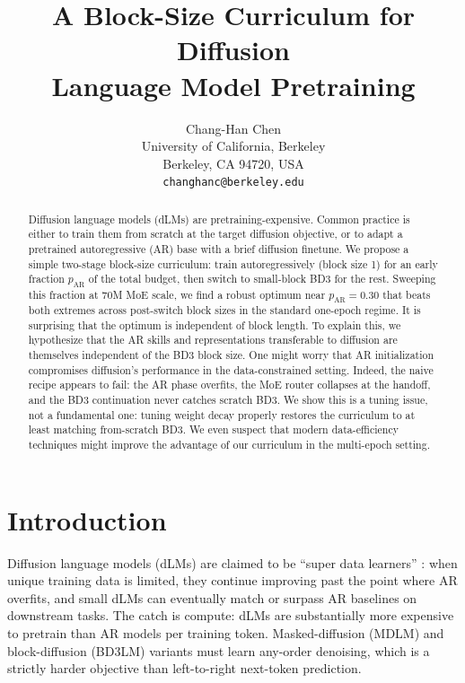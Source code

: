\documentclass{article}
\title{A Block-Size Curriculum for Diffusion\\Language Model Pretraining}
\author{Chang-Han Chen \\
University of California, Berkeley \\
Berkeley, CA 94720, USA \\
\texttt{changhanc@berkeley.edu}
}
\newcommand{\pAR}{p_{\mathrm{AR}}}
\begin{document}
\maketitle

\begin{abstract}
Diffusion language models (dLMs) are pretraining-expensive. Common practice is either to train them from scratch at the target diffusion objective, or to adapt a pretrained autoregressive (AR) base with a brief diffusion finetune. We propose a simple two-stage block-size curriculum: train autoregressively (block size 1) for an early fraction $\pAR$ of the total budget, then switch to small-block BD3 for the rest. Sweeping this fraction at 70M MoE scale, we find a robust optimum near $\pAR{=}0.30$ that beats both extremes across post-switch block sizes in the standard one-epoch regime. It is surprising that the optimum is independent of block length. To explain this, we hypothesize that the AR skills and representations transferable to diffusion are themselves independent of the BD3 block size. One might worry that AR initialization compromises diffusion's performance in the data-constrained setting. Indeed, the naive recipe appears to fail: the AR phase overfits, the MoE router collapses at the handoff, and the BD3 continuation never catches scratch BD3. We show this is a tuning issue, not a fundamental one: tuning weight decay properly restores the curriculum to at least matching from-scratch BD3. We even suspect that modern data-efficiency techniques might improve the advantage of our curriculum in the multi-epoch setting.
\end{abstract}

\section{Introduction}
\label{sec:intro}

Diffusion language models (dLMs) are claimed to be ``super data learners'' \citep{ni2025diffusionlanguagemodelssuper, gao2025whatmakes}: when unique training data is limited, they continue improving past the point where AR overfits, and small dLMs can eventually match or surpass AR baselines on downstream tasks. The catch is compute: dLMs are substantially more expensive to pretrain than AR models per training token. Masked-diffusion (MDLM) and block-diffusion (BD3LM) variants must learn any-order denoising, which is a strictly harder objective than left-to-right next-token prediction.
\end{document}

